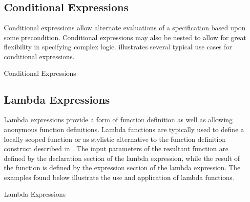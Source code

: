 \documentclass[letterpaper,10pt,draft]{book}
\begin{document}
\subsection{Conditional Expressions}
   \label{sect:CondExpr}

Conditional expressions allow alternate evaluations of a specification based upon
some precondition.  Conditional expressions may also be nested to allow for great
flexibility in specifying complex logic.   illustrates several
typical use cases for conditional expressions.

\begin{example}
\begin{minipage}[t]{0.49\linewidth}
   
\end{minipage}
\begin{minipage}[t]{0.49\linewidth}
   \azbox
   
\end{minipage}

   \caption{Conditional Expressions}
   \label{ex:CondExpr}
\end{example}

\subsection{Lambda Expressions}
   \label{sect:LambdaExpr}

Lambda expressions provide a form of function definition as well as allowing anonymous
function definitions.  Lambda functions are typically used to define a locally scoped
function or as stylistic alternative to the function definition construct described
in .  The input parameters of the resultant function are
defined by the declaration section of the lambda expression, while the result of
the function is defined by the expression section of the lambda expression.  The
examples found below illustrate the use and application of lambda functions.

\begin{example}
\begin{minipage}[t]{0.49\linewidth}
   
\end{minipage}
\begin{minipage}[t]{0.49\linewidth}
   \azed
   
\end{minipage}

   \caption{Lambda Expressions}
   \label{ex:LambdaExpr}
\end{example}
\end{document}

